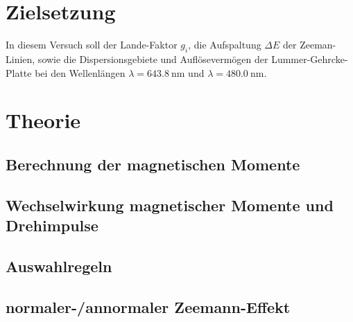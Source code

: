 \section{Zielsetzung}
\label{sec:Zielsetzung}
In diesem Versuch soll der Lande-Faktor $g_i$, die Aufspaltung $\Delta E$ der
Zeeman-Linien, sowie die Dispersionsgebiete und Auflösevermögen der Lummer-Gehrcke-Platte
bei den Wellenlängen $\lambda = \SI{643.8}{\nano\meter}$ und $\lambda = \SI{480.0}{\nano\meter}$.

\section{Theorie}
\label{sec:Theorie}

\subsection{Berechnung der magnetischen Momente}
\label{sec:Berechnung_magnetischer_Momente}

\subsection{Wechselwirkung magnetischer Momente und Drehimpulse}
\label{sec:Wechselwirkungen}

\subsection{Auswahlregeln}
\label{sec:Auswahlregeln}

\subsection{normaler-/annormaler Zeemann-Effekt}
\label{sec:Zeemann}



